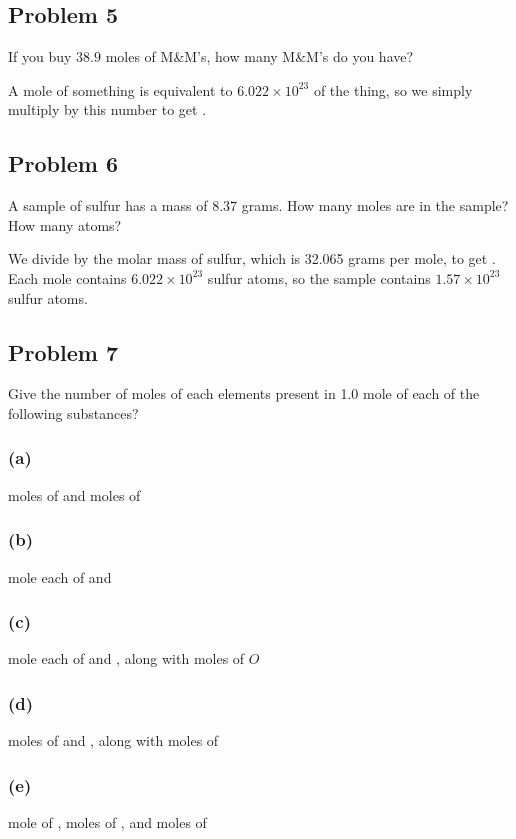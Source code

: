 \documentclass[11pt]{scrartcl}
\begin{document}
\newpage
\subsection{Problem 5}
If you buy $38.9$ moles of M\&M's, how many M\&M's do you have?

A mole of something is equivalent to $6.022 \times 10^{23} $ of the thing, so we simply multiply by this number to get .

\newpage
\subsection{Problem 6}
A sample of sulfur has a mass of $8.37$ grams.
How many moles are in the sample?
How many atoms?

We divide by the molar mass of sulfur, which is 32.065 grams per mole, to get .
Each mole contains $6.022 \times 10^{23}$ sulfur atoms, so the sample contains $\boxed{1.57 \times 10^{23}} $ sulfur atoms.

\newpage
\subsection{Problem 7}
Give the number of moles of each elements present in 1.0 mole of each of the following substances?

\subsubsection{(a)}
 moles of  and  moles of 

\subsubsection{(b)}
 mole each of  and 

\subsubsection{(c)}
 mole each of  and , along with  moles of $O$

\subsubsection{(d)}
 moles of  and , along with  moles of 

\subsubsection{(e)}
 mole of ,  moles of , and  moles of 
\end{document}
